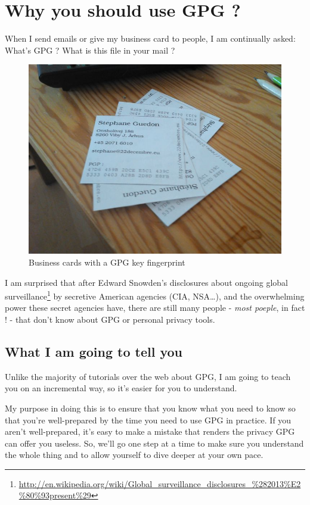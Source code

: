 \chapter{Why you should use GPG ?}

When I send emails or give my business card to people, I am continually
asked: What's GPG ? What is this file in your mail ?

\begin{figure}[htbp]
\centering
\includegraphics[width=0.7\linewidth]{./images/visiting.jpeg}
\caption{Business cards with a GPG key fingerprint}
\end{figure}

I am surprised that after Edward Snowden's disclosures about ongoing global surveillance\footnote{\url{http://en.wikipedia.org/wiki/Global_surveillance_disclosures_\%282013\%E2\%80\%93present\%29}} by secretive
American agencies (CIA, NSA\ldots{}), and the overwhelming power these secret agencies have, there are still many people - \emph{most poeple},
in fact ! - that don't know about GPG or personal privacy tools.

\section{What I am going to tell you}\label{what-i-am-going-to-tell-you}

Unlike the majority of tutorials over the web about GPG, I am going to
teach you on an incremental way, so it's easier for you to understand.

My purpose in doing this is to ensure that you know what you need to
know so that you're well-prepared by the time you need to use GPG in
practice. If you aren't well-prepared, it's easy to make a mistake that
renders the privacy GPG can offer you useless. So, we'll go one step at
a time to make sure you understand the whole thing and to allow yourself
to dive deeper at your own pace.

